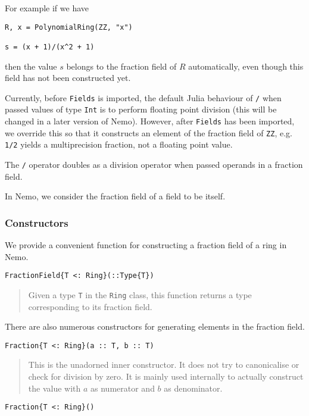 \documentclass[a4paper,10pt]{article}
\newcommand{\code}{\lstinline}
\newcommand{\desc}[1]{\vspace{-3mm}\begin{quote}#1\end{quote}}
\begin{document}
{{{For example if we have

\begin{lstlisting}
R, x = PolynomialRing(ZZ, "x")

s = (x + 1)/(x^2 + 1)
\end{lstlisting}

then the value $s$ belongs to the fraction field of $R$ automatically, even
though this field has not been constructed yet.

Currently, before \code{Fields} is imported, the default Julia behaviour of
\code{/} when passed values of type \code{Int} is to perform floating point
division (this will be changed in a later version of Nemo). However, after 
\code{Fields} has been imported, we override this so that it constructs an
element of the fraction field of \code{ZZ}, e.g. \code{1/2} yields a 
multiprecision fraction, not a floating point value.

The \code{/} operator doubles as a division operator when passed operands
in a fraction field.

In Nemo, we consider the fraction field of a field to be itself.

\subsubsection{Constructors}

We provide a convenient function for constructing a fraction field of a ring in
Nemo.

\begin{lstlisting}
FractionField{T <: Ring}(::Type{T})
\end{lstlisting}

\desc{Given a type \code{T} in the \code{Ring} class, this function returns a
type corresponding to its fraction field.}

There are also numerous constructors for generating elements in the fraction
field.

\begin{lstlisting}
Fraction{T <: Ring}(a :: T, b :: T)
\end{lstlisting}

\desc{This is the unadorned inner constructor. It does not try to canonicalise
or check for division by zero. It is mainly used internally to actually 
construct the value with $a$ as numerator and $b$ as denominator.}

\begin{lstlisting}
Fraction{T <: Ring}()
\end{lstlisting}

}}}
\end{document}
